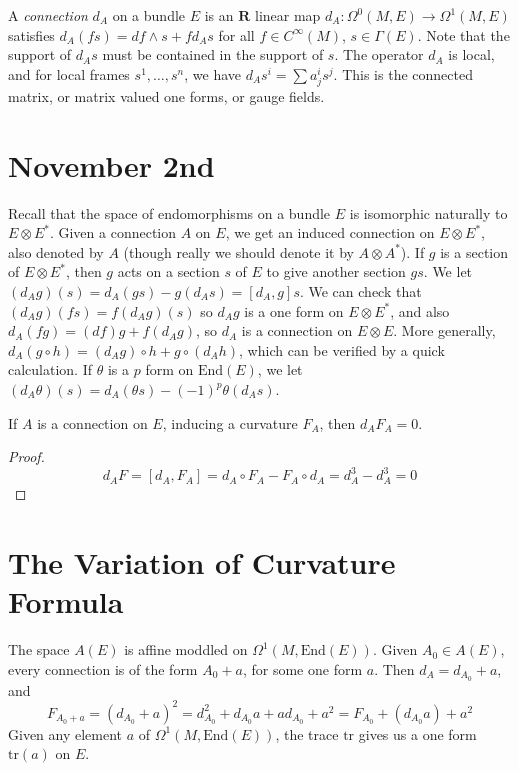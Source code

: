 A \emph{connection} $d_A$ on a bundle $E$ is an $\mathbf{R}$ linear map $d_A: \Omega^0(M,E) \to \Omega^1(M,E)$ satisfies $d_A(fs) = df \wedge s + f d_A s$ for all $f \in C^\infty(M)$, $s \in \Gamma(E)$. Note that the support of $d_A s$ must be contained in the support of $s$. The operator $d_A$ is local, and for local frames $s^1, \dots, s^n$, we have $d_A s^i = \sum a_j^i s^j$. This is the connected matrix, or matrix valued one forms, or gauge fields.


\section{November 2nd}

Recall that the space of endomorphisms on a bundle $E$ is isomorphic naturally to $E \otimes E^*$. Given a connection $A$ on $E$, we get an induced connection on $E \otimes E^*$, also denoted by $A$ (though really we should denote it by $A \otimes A^*$). If $g$ is a section of $E \otimes E^*$, then $g$ acts on a section $s$ of $E$ to give another section $gs$. We let $(d_A g)(s) = d_A(gs) - g(d_A s) = [d_A, g] s$. We can check that $(d_A g)(fs) = f(d_A g)(s)$ so $d_A g$ is a one form on $E \otimes E^*$, and also $d_A(fg) = (df) g + f (d_A g)$, so $d_A$ is a connection on $E \otimes E$. More generally, $d_A(g \circ h) = (d_A g) \circ h + g \circ (d_A h)$, which can be verified by a quick calculation. If $\theta$ is a $p$ form on $\text{End}(E)$, we let $(d_A \theta)(s) = d_A(\theta s) - (-1)^p \theta(d_A s)$.

\begin{theorem}
    If $A$ is a connection on $E$, inducing a curvature $F_A$, then $d_A F_A = 0$.
\end{theorem}
\begin{proof}
    \[ d_A F = [d_A,F_A] = d_A \circ F_A - F_A \circ d_A = d_A^3 - d_A^3 = 0 \]
\end{proof}

\section{The Variation of Curvature Formula}

The space $A(E)$ is affine moddled on $\Omega^1(M, \text{End}(E))$. Given $A_0 \in A(E)$, every connection is of the form $A_0 + a$, for some one form $a$. Then $d_A = d_{A_0} + a$, and
%
\[ F_{A_0 + a} = (d_{A_0} + a)^2 = d_{A_0}^2 + d_{A_0} a + a d_{A_0} + a^2 = F_{A_0} + (d_{A_0} a) + a^2 \]
%
Given any element $a$ of $\Omega^1(M, \text{End}(E))$, the trace $\text{tr}$ gives us a one form $\text{tr}(a)$ on $E$.

